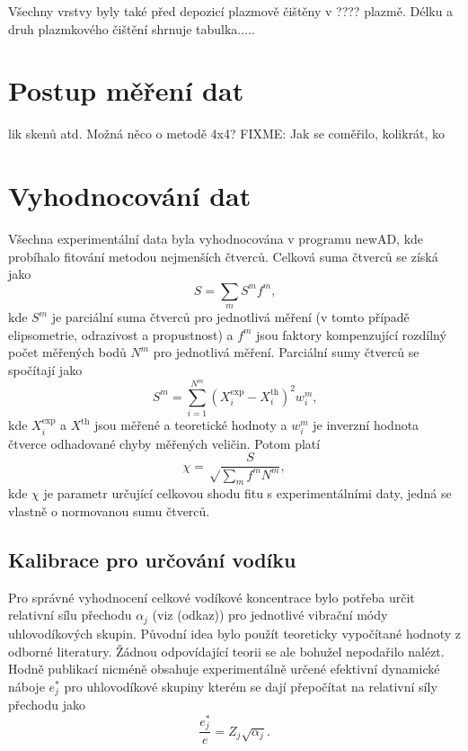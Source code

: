 Všechny vrstvy byly také před depozicí plazmově čištěny v ???? plazmě. Délku a druh plazmkového čištění shrnuje tabulka.....

\section{Postup měření dat}lik skenů atd. Možná něco o metodě 4x4?
FIXME: Jak se coměřilo, kolikrát, ko

\section{Vyhodnocování dat}
Všechna experimentální data byla vyhodnocována v programu newAD, kde probíhalo fitování metodou nejmenších čtverců. Celková suma čtverců se získá jako
%
\begin{equation} S = \sum_m S^m f^m \text{,}\end{equation}
%
kde $S^m$ je parciální suma čtverců pro jednotlivá měření (v tomto případě elipsometrie, odrazivost a propustnost) a $f^m$ jsou faktory kompenzující rozdílný počet měřených bodů $N^m$ pro jednotlivá měření. Parciální sumy čtverců se spočítají jako
%
\begin{equation} S^m = \sum_{i=1}^{N^m} (X_i^\mathrm{exp} - X_i^\mathrm{th})^2 w_i^m \text{,} \end{equation}
%
kde $X_i^\mathrm{exp}$ a $X^\mathrm{th}$ jsou měřené a teoretické hodnoty a $w_i^m$ je inverzní hodnota čtverce odhadované chyby měřených veličin. Potom platí \cite{Franta2011}
%
\begin{equation} \chi = \sqrt \frac{S}{\sum_m f^m N^m} \mathrm{,}\end{equation}
kde $\chi$ je parametr určující celkovou shodu fitu s experimentálními daty, jedná se vlastně o normovanou sumu čtverců.

\subsection{Kalibrace pro určování vodíku}
Pro správné vyhodnocení celkové vodíkové koncentrace bylo potřeba určit relativní sílu přechodu $\alpha_j$ (viz (odkaz)) pro jednotlivé vibrační módy uhlovodíkových skupin. Původní idea bylo použít teoreticky vypočítané hodnoty z odborné literatury. Žádnou odpovídající teorii se ale bohužel nepodařilo nalézt. Hodně publikací nicméně obsahuje experimentálně určené efektivní dynamické náboje $e_j^*$ pro uhlovodíkové skupiny kterém se dají přepočítat na relativní síly přechodu jako \cite{sumrule2}
\begin{equation}
\frac{e_j^*}{e} = Z_j \sqrt{\alpha_j} \text{.}
\label{efch2str}
\end{equation}

